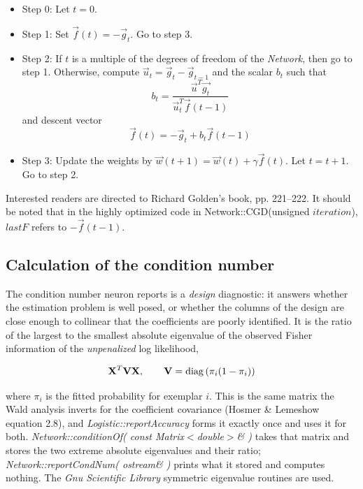 \documentclass{report}
\begin{document}
\begin{itemize}
\item Step 0: Let $t=0$.
\item Step 1: Set $\vec{f}(t)=-\vec{g}_t$.  Go to step 3.
\item Step 2: If $t$ is a multiple of the degrees of freedom of the
      {\em Network}, then go to step 1.  Otherwise, compute
      $\vec{u}_t=\vec{g}_t-\vec{g}_{t-1}$ and the scalar $b_t$
      such that
\begin{displaymath}
b_t=\frac{\vec{u}^T\vec{g_t}}{\vec{u}^T_t\vec{f}(t-1)}
\end{displaymath}
and descent vector
\begin{displaymath}
\vec{f}(t)=-\vec{g}_t+b_t\vec{f}(t-1)
\end{displaymath}
\item Step 3: Update the weights by
$\vec{w}(t+1)=\vec{w}(t)+\gamma\vec{f}(t)$.
Let $t=t+1$.  Go to step 2.
\end{itemize}

Interested readers are directed to Richard Golden's book, pp.
221--222. It should be noted that in the highly optimized code in
Network::CGD(unsigned $iteration$), $lastF$ refers to
$-\vec{f}(t-1)$.

\subsection{Calculation of the condition number}

The condition number neuron reports is a {\em design} diagnostic: it
answers whether the estimation problem is well posed, or whether the
columns of the design are close enough to collinear that the
coefficients are poorly identified.  It is the ratio of the largest to
the smallest absolute eigenvalue of the observed Fisher information of
the {\em unpenalized} log likelihood,

\begin{displaymath}
{\bf X}^T {\bf V} {\bf X}, \qquad
{\bf V} = \mathrm{diag}\left( \pi_i ( 1 - \pi_i ) \right)
\end{displaymath}

where $\pi_i$ is the fitted probability for exemplar $i$.  This is the
same matrix the Wald analysis inverts for the coefficient covariance
(Hosmer \& Lemeshow equation 2.8), and
{\em Logistic::reportAccuracy} forms it exactly once and uses it for
both.  {\em Network::conditionOf( const Matrix$<$double$>$\& )} takes
that matrix and stores the two extreme absolute eigenvalues and their
ratio; {\em Network::reportCondNum( ostream\& )} prints what it stored
and computes nothing.  The {\em Gnu Scientific Library} symmetric
eigenvalue routines are used.
\end{document}
